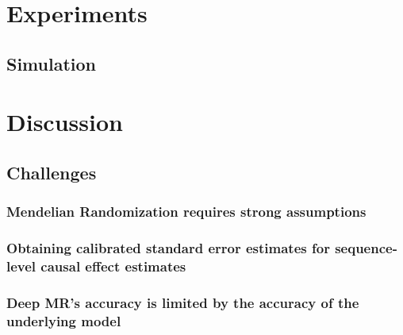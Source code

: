 \section{Experiments}
\subsection{Simulation}

\subsection{}

\section{Discussion}
\subsection{Challenges}
\subsubsection{Mendelian Randomization requires strong assumptions}

\subsubsection{Obtaining calibrated standard error estimates for sequence-level causal effect estimates}

\subsubsection{Deep MR's accuracy is limited by the accuracy of the underlying model}



